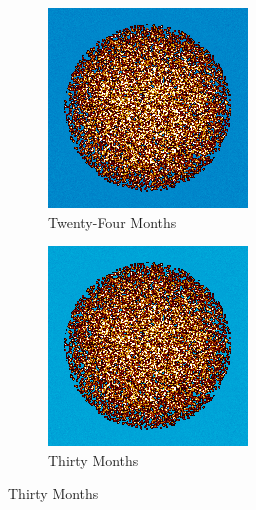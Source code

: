 \begin{figure}[H]
\begin{subfigure}{0.4\textwidth}
  \includegraphics[width=0.95\linewidth]{figures/burn-20-bstep4}
  \caption{Twenty-Four Months}
  \label{fig:bstep4}
\end{subfigure}%
%
\begin{subfigure}{0.4\textwidth}
  \includegraphics[width=0.95\linewidth]{figures/burn-20-bstep5}
  \caption{Thirty Months}
  \label{fig:bstep5}
\end{subfigure}%


\end{figure}
